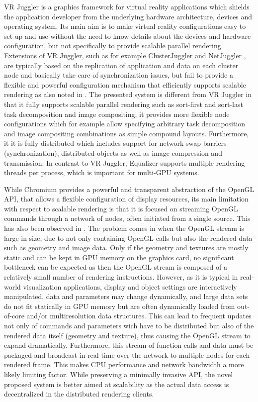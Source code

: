 \documentclass[journal]{vgtc}                %
\begin{document}
VR Juggler \cite{BJHMBC:01,JBBC:98} is a graphics framework for virtual
reality applications which shields the application developer from the
underlying hardware architecture, devices and operating system. Its main
aim is to make virtual reality configurations easy to set up and use
without the need to know details about the devices and hardware
configuration, but not specifically to provide scalable parallel
rendering. Extensions of VR Juggler, such as for example ClusterJuggler
\cite{BC:03} and NetJuggler \cite{AGLMR:02}, are typically based on the
replication of application and data on each cluster node and basically
take care of synchronization issues, but fail to provide a flexible and
powerful configuration mechanism that efficiently supports scalable
rendering as also noted in \cite{SWNH:03}. The presented system is different from VR Juggler in that it
fully supports scalable parallel rendering such as sort-first and
sort-last task decomposition and image compositing, it provides more
flexible node configurations which for example allow specifying
arbitrary task decomposition and image compositing combinations as
simple compound layouts. Furthermore, it it is fully distributed which includes
support for network swap barriers (synchronization), distributed objects
as well as image compression and transmission. In contrast to VR
Juggler, Equalizer supports multiple rendering threads per process,
which is important for multi-GPU systems.

While Chromium \cite{HHNFAKK:02} provides a powerful and transparent
abstraction of the OpenGL API, that allows a flexible configuration of
display resources, its main limitation with respect to scalable
rendering is that it is focused on streaming OpenGL commands through a
network of nodes, often initiated from a single source. This has also been
observed in \cite{SWNH:03}. The problem
comes in when the OpenGL stream is large in size, due to not only
containing OpenGL calls but also the rendered data such as geometry
and image data. Only if the geometry and textures are mostly static
and can be kept in GPU memory on the graphics card, no significant
bottleneck can be expected as then the OpenGL stream is composed of a
relatively small number of rendering instructions. However, as it is
typical in real-world visualization applications, display and object
settings are interactively manipulated, data and parameters may change
dynamically, and large data sets do not fit statically in GPU memory but
are often dynamically loaded from out-of-core and/or multiresolution
data structures. This can lead to frequent updates not only of commands and
parameters wich have to be distributed but also of
the rendered data itself (geometry and texture), thus causing the OpenGL stream
to expand dramatically. Furthermore, this stream of function calls and
data must be packaged and broadcast in real-time over the network to
multiple nodes for each rendered frame. This makes CPU performance and
network bandwidth a more likely limiting factor. While preserving a minimally
invasive API, the novel proposed system is better aimed at scalability
as the actual data access is decentralized in the distributed rendering
clients.
\end{document}
